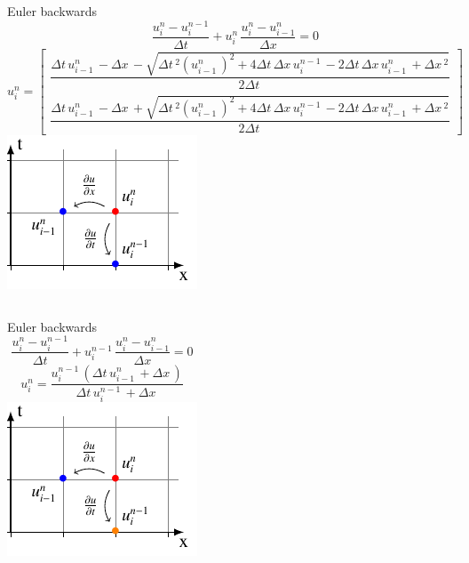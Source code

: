 %
%
%

\begin{frame}
  \begin{columns}
      Euler backwards
  $$\frac{u_{i}^{n}-u_{i}^{n-1}}{\Delta t}+ u_{i}^{n}\, \frac{u_{i}^{n}-u_{i-1}^{n}}{\Delta x}=0$$
  \tiny{
  $$ u_{i}^{n} = \begin{bmatrix}
     \dfrac{\Delta{t}\, u^{n}_{i-1}\, - \Delta{x}\, - \sqrt{\Delta{t}\,^{2} \left(u^{n}_{i-1}\,\right)^{2} + 4 \Delta{t}\, \Delta{x}\, u^{n-1}_{i}\, - 2 \Delta{t}\, \Delta{x}\, u^{n}_{i-1}\, + \Delta{x}\,^{2}}}{2 \Delta{t}\,} \\[15pt]
     \dfrac{\Delta{t}\, u^{n}_{i-1}\, - \Delta{x}\, + \sqrt{\Delta{t}\,^{2} \left(u^{n}_{i-1}\,\right)^{2} + 4 \Delta{t}\, \Delta{x}\, u^{n-1}_{i}\, - 2 \Delta{t}\, \Delta{x}\, u^{n}_{i-1}\, + \Delta{x}\,^{2}}}{2 \Delta{t}\,}
  \end{bmatrix}$$}
    \includegraphics[height=.9\textheight]{../BurgersEquation/tikz/quadratic/quadratic.pdf}\\
  \end{columns}
\end{frame}

\begin{frame}
  \begin{columns}
      Euler backwards
  $$\frac{u_{i}^{n}-u_{i}^{n-1}}{\Delta t}+ u_{i}^{n-1}\, \frac{u_{i}^{n}-u_{i-1}^{n}}{\Delta x}=0$$
  $$ u_{i}^{n} = \frac{u^{n-1}_{i}\, \left(\Delta{t}\, u^{n}_{i-1}\, + \Delta{x}\,\right)}{\Delta{t}\, u^{n-1}_{i}\, + \Delta{x}\,} $$
    \includegraphics[height=1\textheight]{../BurgersEquation/tikz/linear5/linear5.pdf}\\
  \end{columns}
\end{frame}


